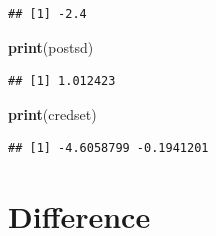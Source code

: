 \documentclass[
]{article}
\newenvironment{Shaded}{\begin{snugshade}}{\end{snugshade}}
\newcommand{\FunctionTok}[1]{\textcolor[rgb]{0.13,0.29,0.53}{\textbf{#1}}}
\newcommand{\NormalTok}[1]{#1}
\begin{document}
\begin{verbatim}
## [1] -2.4
\end{verbatim}

\begin{Shaded}
\begin{Highlighting}[]
  \FunctionTok{print}\NormalTok{(postsd)}
\end{Highlighting}
\end{Shaded}

\begin{verbatim}
## [1] 1.012423
\end{verbatim}

\begin{Shaded}
\begin{Highlighting}[]
  \FunctionTok{print}\NormalTok{(credset)}
\end{Highlighting}
\end{Shaded}

\begin{verbatim}
## [1] -4.6058799 -0.1941201
\end{verbatim}

\section{Difference}\label{difference}
\end{document}
